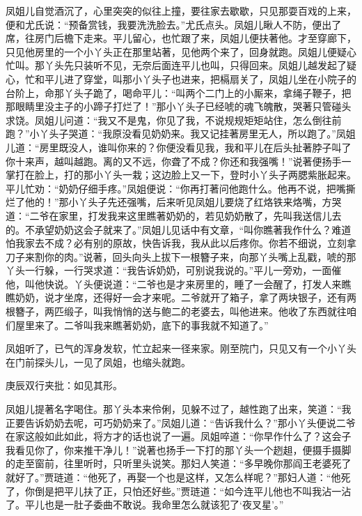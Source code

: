 \begin{parag}
    凤姐儿自觉酒沉了，心里突突的似往上撞，要往家去歇歇，只见那耍百戏的上来，便和尤氏说：“预备赏钱，我要洗洗脸去。”尤氏点头。凤姐儿瞅人不防，便出了席，往房门后檐下走来。平儿留心，也忙跟了来，凤姐儿便扶著他。才至穿廊下，只见他房里的一个小丫头正在那里站著，见他两个来了，回身就跑。凤姐儿便疑心忙叫。那丫头先只装听不见，无奈后面连平儿也叫，只得回来。凤姐儿越发起了疑心，忙和平儿进了穿堂，叫那小丫头子也进来，把槅扇关了，凤姐儿坐在小院子的台阶上，命那丫头子跪了，喝命平儿：“叫两个二门上的小厮来，拿绳子鞭子，把那眼睛里没主子的小蹄子打烂了！”那小丫头子已经唬的魂飞魄散，哭著只管碰头求饶。凤姐儿问道：“我又不是鬼，你见了我，不说规规矩矩站住，怎么倒往前跑？”小丫头子哭道：“我原没看见奶奶来。我又记挂著房里无人，所以跑了。”凤姐儿道：“房里既没人，谁叫你来的？你便没看见我，我和平儿在后头扯著脖子叫了你十来声，越叫越跑。离的又不远，你聋了不成？你还和我强嘴！”说著便扬手一掌打在脸上，打的那小丫头一栽；这边脸上又一下，登时小丫头子两腮紫胀起来。平儿忙劝：“奶奶仔细手疼。”凤姐便说：“你再打著问他跑什么。他再不说，把嘴撕烂了他的！”那小丫头子先还强嘴，后来听见凤姐儿要烧了红烙铁来烙嘴，方哭道：“二爷在家里，打发我来这里瞧著奶奶的，若见奶奶散了，先叫我送信儿去的。不承望奶奶这会子就来了。”凤姐儿见话中有文章，“叫你瞧著我作什么？难道怕我家去不成？必有别的原故，快告诉我，我从此以后疼你。你若不细说，立刻拿刀子来割你的肉。”说著，回头向头上拔下一根簪子来，向那丫头嘴上乱戳，唬的那丫头一行躲，一行哭求道：“我告诉奶奶，可别说我说的。”平儿一旁劝，一面催他，叫他快说。丫头便说道：“二爷也是才来房里的，睡了一会醒了，打发人来瞧瞧奶奶，说才坐席，还得好一会才来呢。二爷就开了箱子，拿了两块银子，还有两根簪子，两匹缎子，叫我悄悄的送与鲍二的老婆去，叫他进来。他收了东西就往咱们屋里来了。二爷叫我来瞧著奶奶，底下的事我就不知道了。”
\end{parag}


\begin{parag}
    凤姐听了，已气的浑身发软，忙立起来一径来家。刚至院门，只见又有一个小丫头在门前探头儿，一见了凤姐，也缩头就跑。\begin{note}庚辰双行夹批：如见其形。\end{note}凤姐儿提著名字喝住。那丫头本来伶俐，见躲不过了，越性跑了出来，笑道：“我正要告诉奶奶去呢，可巧奶奶来了。”凤姐儿道：“告诉我什么？”那小丫头便说二爷在家这般如此如此，将方才的话也说了一遍。凤姐啐道：“你早作什么了？这会子我看见你了，你来推干净儿！”说著也扬手一下打的那丫头一个趔趄，便摄手摄脚的走至窗前，往里听时，只听里头说笑。那妇人笑道：“多早晚你那阎王老婆死了就好了。”贾琏道：“他死了，再娶一个也是这样，又怎么样呢？”那妇人道：“他死了，你倒是把平儿扶了正，只怕还好些。”贾琏道：“如今连平儿他也不叫我沾一沾了。平儿也是一肚子委曲不敢说。我命里怎么就该犯了‘夜叉星’。”
\end{parag}


